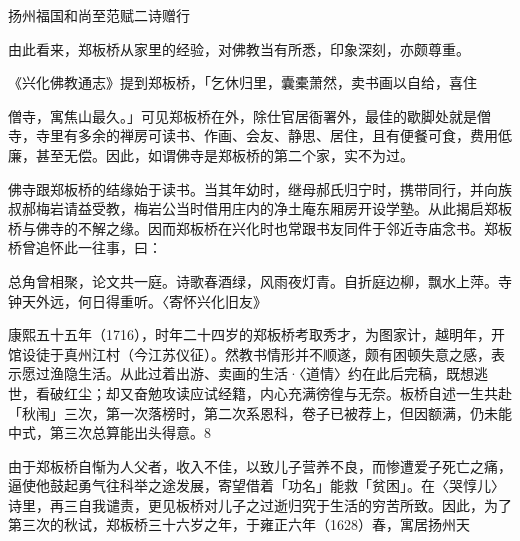 扬州福国和尚至范赋二诗赠行

由此看来，郑板桥从家里的经验，对佛教当有所悉，印象深刻，亦颇尊重。

\vfill
\begin{BookNotes}
\end{BookNotes}


\begin{BookQuote}
《兴化佛教通志》提到郑板桥，「乞休归里，囊橐萧然，卖书画以自给，喜住
\end{BookQuote}

僧寺，寓焦山最久。」可见郑板桥在外，除仕官居衙署外，最佳的歇脚处就是僧寺，寺里有多余的禅房可读书、作画、会友、静思、居住，且有便餐可食，费用低廉，甚至无偿。因此，如谓佛寺是郑板桥的第二个家，实不为过。

佛寺跟郑板桥的结缘始于读书。当其年幼时，继母郝氏归宁时，携带同行，并向族叔郝梅岩请益受教，梅岩公当时借用庄内的净土庵东厢房开设学塾。从此揭启郑板桥与佛寺的不解之缘。因而郑板桥在兴化时也常跟书友同件于邻近寺庙念书。郑板桥曾追怀此一往事，曰：

\begin{BookQuote}
总角曾相聚，论文共一庭。诗歌春酒绿，风雨夜灯青。自折庭边柳，飘水上萍。寺钟天外远，何日得重听。〈寄怀兴化旧友》
\end{BookQuote}

康熙五十五年（1716），时年二十四岁的郑板桥考取秀才，为图家计，越明年，开馆设徒于真州江村（今江苏仪征）。然教书情形并不顺遂，颇有困顿失意之感，表示愿过渔隐生活。从此过着出游、卖画的生活·〈道情〉约在此后完稿，既想逃世，看破红尘；却又奋勉攻读应试经籍，内心充满徬徨与无奈。板桥自述一生共赴「秋闱」三次，第一次落榜时，第二次系恩科，卷子已被荐上，但因额满，仍未能中式，第三次总算能出头得意。8

由于郑板桥自惭为人父者，收入不佳，以致儿子营养不良，而惨遭爱子死亡之痛，逼使他鼓起勇气往科举之途发展，寄望借着「功名」能救「贫困」。在〈哭惇儿〉诗里，再三自我谴责，更见板桥对儿子之过逝归究于生活的穷苦所致。因此，为了第三次的秋试，郑板桥三十六岁之年，于雍正六年（1628）春，寓居扬州天

\vfill
\begin{BookNotes}
\end{BookNotes}

